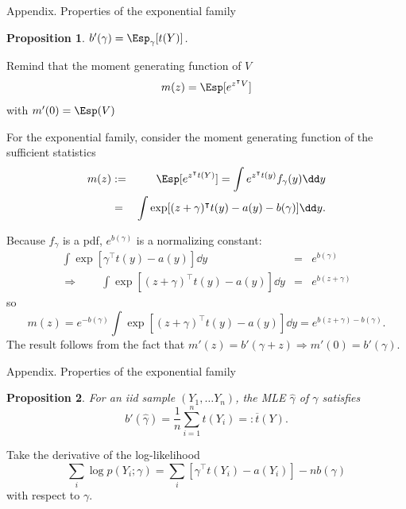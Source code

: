 \documentclass[compress,10pt]{beamer}
\newtheorem{proposition}{Proposition}
\begin{document}
\begin{frame}[allowframebreaks]{Appendix. Properties of the exponential family}
\label{app:proof1}

\begin{proposition} 
$b'(\gamma) = \Esp_ \gamma[t(Y)]$.
\end{proposition}

Remind that the moment generating function of   $V$
$$m(z) = \Esp[e^{z^\intercal V}]$$ with
$m'(0) = \Esp(V)$

For the exponential family, consider the moment generating function of the sufficient statistics  
\begin{eqnarray*}
 m(z) &:=& \Esp[e ^{z^\intercal  t(Y)}] = \int e^{z^\intercal  t(y)} f_\gamma(y) \dd y \\
&=& \int \exp[(z + \gamma)^\intercal  t(y) - a(y) - b(\gamma)] \dd y.
\end{eqnarray*}

Because $f_\gamma$ is a pdf, $e^{b(\gamma)}$ is a normalizing constant:
\begin{eqnarray*}
\int \exp[\gamma^\intercal  t(y) - a(y)] \dd y & = & e^{b(\gamma)} \\
\Rightarrow \qquad \int \exp[(z + \gamma)^\intercal  t(y) - a(y)] \dd y & = & e^{b(z +\gamma)} 
\end{eqnarray*}
so
$$
m(z) = e^{-b(\gamma)} \int \exp[(z + \gamma)^\intercal  t(y) - a(y)] \dd y 
= e^{b(z + \gamma) - b(\gamma)}.
$$ 
The result follows from the fact that $m'(z) = b'(\gamma+z) \Rightarrow m'(0) = b'(\gamma)$.
\hyperlink{Prop:ExpFam-bprime}{}


\end{frame}
\begin{frame}[allowframebreaks]{Appendix. Properties of the exponential family}
\label{app:proof2}
\begin{proposition}
  For an iid sample $(Y_1, \dots Y_n)$, the MLE $\widehat{\gamma}$ of $\gamma$ satisfies 
  \[
  b' (\widehat{\gamma}) = \frac{1}{n}\sum_{i=1}^n t(Y_i) =: \overline{t}(Y).
  \] 
\end{proposition}


Take the derivative of the log-likelihood 
\[
\sum_i \log p(Y_i; \gamma) = \sum_i [\gamma^\intercal t(Y_i) - a(Y_i)] - n b(\gamma)
\]
with respect to $\gamma$. 


\hyperlink{Prop:ExpFam-bprime}{}


\end{frame}
 
\end{document}

